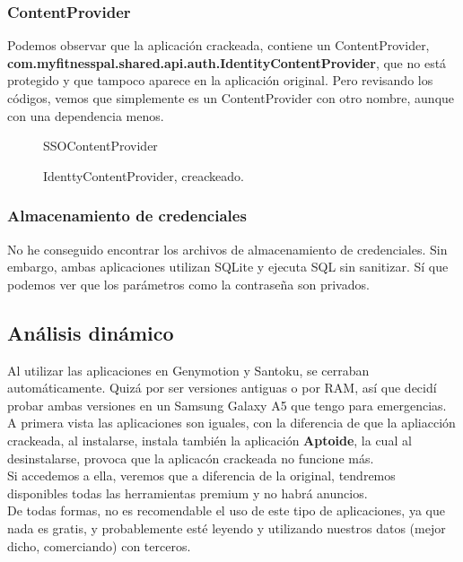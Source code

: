 \documentclass[12pt,twoside]{article}
\begin{document}
\subsubsection{ContentProvider}
Podemos observar que la aplicación crackeada, contiene un ContentProvider, \textbf{com.myfitnesspal.shared.api.auth.IdentityContentProvider}, que no está protegido y que tampoco aparece en la aplicación original. Pero revisando los códigos, vemos que simplemente es un ContentProvider con otro nombre, aunque con una dependencia menos. 
\begin{figure}[H]
    \centering
    \caption{SSOContentProvider}
\end{figure}
\begin{figure}[H]
    \centering
    \caption{IdenttyContentProvider, creackeado.}
\end{figure}

\subsubsection{Almacenamiento de credenciales}
No he conseguido encontrar los archivos de almacenamiento de credenciales. Sin embargo, ambas aplicaciones utilizan SQLite y ejecuta SQL sin sanitizar. 
Sí que podemos ver que los parámetros como la contraseña son privados.
\subsection{Análisis dinámico}
Al utilizar las aplicaciones en Genymotion y Santoku, se cerraban automáticamente. Quizá por ser versiones antiguas o por RAM, así que decidí probar ambas versiones en un Samsung Galaxy A5 que tengo para emergencias. A primera vista las aplicaciones son iguales, con la diferencia de que la apliacción crackeada, al instalarse, instala también la aplicación \textbf{Aptoide}, la cual al desinstalarse, provoca que la aplicacón crackeada no funcione más.\\
Si accedemos a ella, veremos que a diferencia de la original, tendremos disponibles todas las herramientas premium y no habrá anuncios. \\
De todas formas, no es recomendable el uso de este tipo de aplicaciones, ya que  nada es gratis, y probablemente esté leyendo y utilizando nuestros datos (mejor dicho, comerciando) con terceros. 
\end{document}
